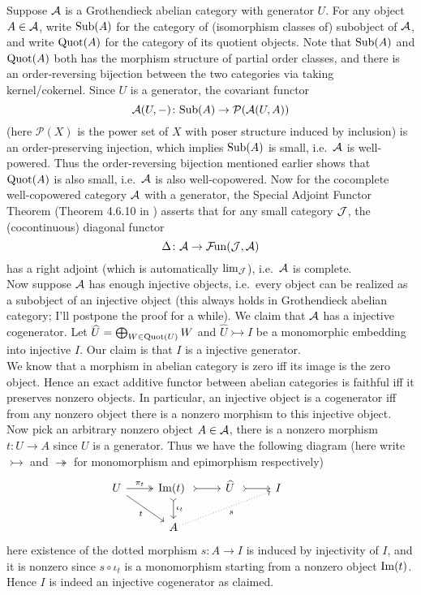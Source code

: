 \documentclass[twoside]{article}
\begin{document}
Suppose ${\mathcal{A}}$ is a Grothendieck abelian category with generator $U$. For any object $A \in {\mathcal{A}}$, write $\mathrm{Sub}(A)$ for the category of (isomorphism classes of) subobject of ${\mathcal{A}}$, and write $\mathrm{Quot}(A)$ for the category of its quotient objects.
Note that $\mathrm{Sub}(A)$ and $\mathrm{Quot}(A)$ both has the morphism structure of partial order classes, and there is an order-reversing bijection between the two categories via taking kernel/cokernel. Since $U$ is a generator, the covariant functor $${\mathcal{A}}(U, -)\colon \mathrm{Sub}(A) \rightarrow \mathcal{P}({\mathcal{A}}(U,A))$$
(here $\mathcal{P}(X)$ is the power set of $X$ with poser structure induced by inclusion) is an order-preserving injection, which implies $\mathrm{Sub}(A)$ is small, i.e.\ ${\mathcal{A}}$ is well-powered. Thus the order-reversing bijection mentioned earlier shows that $\mathrm{Quot}(A)$ is also small, i.e.\ ${\mathcal{A}}$ is also well-copowered. Now for the cocomplete well-copowered category ${\mathcal{A}}$ with a generator, the Special Adjoint Functor Theorem (Theorem 4.6.10 in \cite{Rie17}) asserts that for any small category ${\mathcal{J}}$, the (cocontinuous) diagonal functor $$\Delta\colon {\mathcal{A}} \rightarrow \mathcal{F}\mkern-2mu\mathrm{un}({\mathcal{J}}, {\mathcal{A}})$$ has a right adjoint (which is automatically $\lim_{\mathcal{J}}$), i.e.\ ${\mathcal{A}}$ is complete.\\

Now suppose ${\mathcal{A}}$ has enough injective objects, i.e.\ every object can be realized as a subobject of an injective object (this always holds in Grothendieck abelian category; I'll postpone the proof for a while). We claim that ${\mathcal{A}}$ has a injective cogenerator. Let $\widehat{U} = \bigoplus_{W \in \mathrm{Quot}(U)} W$ and $\widehat{U} \rightarrowtail I$ be a monomorphic embedding into injective $I$. Our claim is that $I$ is a injective generator. \\

We know that a morphism in abelian category is zero iff its image is the zero object. Hence an exact additive functor between abelian categories is faithful iff it preserves nonzero objects. In particular, an injective object is a cogenerator iff from any nonzero object there is a nonzero morphism to this injective object. Now pick an arbitrary nonzero object $A \in {\mathcal{A}}$, there is a nonzero morphism $t\colon U \rightarrow A$ since $U$ is a generator. Thus we have the following diagram (here write $\rightarrowtail$ and $\twoheadrightarrow$ for monomorphism and epimorphism respectively)
$$\begin{tikzcd}
    U\ar[rd, "t"'] \ar[r, two heads, "\pi_t"] & \im(t) \  \ar[d, tail, "\iota_t"] \ar[r, tail]  & \widehat{U} \  \ar[r, tail] & I \\
& A \ar[rru, dotted, "s"']&&&
\end{tikzcd}$$
here existence of the dotted morphism $s\colon A \rightarrow I$ is induced by injectivity of $I$, and it is nonzero since $s \circ \iota_t$ is a monomorphism starting from a nonzero object $\mathrm{Im}(t)$. Hence $I$ is indeed an injective cogenerator as claimed.\\
\end{document}
